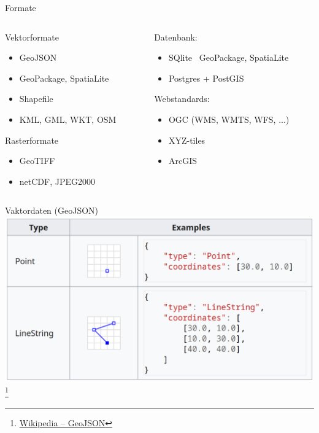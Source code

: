 \documentclass{beamer}
\begin{document}
		\begin{frame}{Formate}
			\begin{columns}[t]
				\begin{column}{0.47\textwidth}
					Vektorformate
					\begin{itemize}
						\item GeoJSON
						\item GeoPackage, SpatiaLite
						\item Shapefile
						\item KML, GML, WKT, OSM
					\end{itemize}
					\pause
					Rasterformate
					\begin{itemize}
						\item GeoTIFF
						\item netCDF, JPEG2000
					\end{itemize}
					\pause
				\end{column}
				\begin{column}{0.53\textwidth}
					Datenbank:
					\begin{itemize}
						\item SQlite \textrightarrow\ GeoPackage, SpatiaLite
						\item Postgres + PostGIS
					\end{itemize}
					\pause
					Webstandards:
					\begin{itemize}
						\item OGC (WMS, WMTS, WFS, ...)
						\item XYZ-tiles
						\item ArcGIS
					\end{itemize}
				\end{column}
			\end{columns}
		\end{frame}
		
		\begin{frame}{Vaktordaten (GeoJSON)}
			\includegraphics[width=\textwidth]{images/geodata-vector-1.png}\footnote{\href{https://en.wikipedia.org/wiki/GeoJSON}{Wikipedia -- GeoJSON}}
		\end{frame}
		
\end{document}
